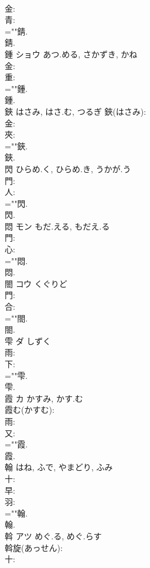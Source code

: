 \documentclass[8pt]{extreport}
\begin{document}
\begin{CJK}{UTF8}{min}
\\	金: 
\\	青: 
\\	=""錆.
\\	錆.
\\	鍾	ショウ	あつ.める, さかずき, かね		
\\	金: 
\\	重: 
\\	=""鍾.
\\	鍾.
\\	鋏		はさみ, はさ.む, つるぎ			鋏(はさみ): 
\\	金: 
\\	夾: 
\\	=""鋏.
\\	鋏.
\\	閃		ひらめ.く, ひらめ.き, うかが.う				
\\	門: 
\\	人: 
\\	=""閃.
\\	閃.
\\	悶	モン	もだ.える, もだえ.る		
\\	門: 
\\	心: 
\\	=""悶.
\\	悶.
\\	閤	コウ	くぐりど		
\\	門: 
\\	合: 
\\	=""閤.
\\	閤.
\\	雫	ダ	しずく		
\\	雨: 
\\	下: 
\\	=""雫.
\\	雫.
\\	霞	カ	かすみ, かす.む		
\\	霞む(かすむ): 
\\	雨: 
\\	又: 
\\	=""霞.
\\	霞.
\\	翰		はね, ふで, やまどり, ふみ				
\\	十: 
\\	早: 
\\	羽: 
\\	=""翰.
\\	翰.
\\	斡	アツ	めぐ.る, めぐ.らす		
\\	斡旋(あっせん): 
\\	十: 

\end{CJK}
\end{document}

